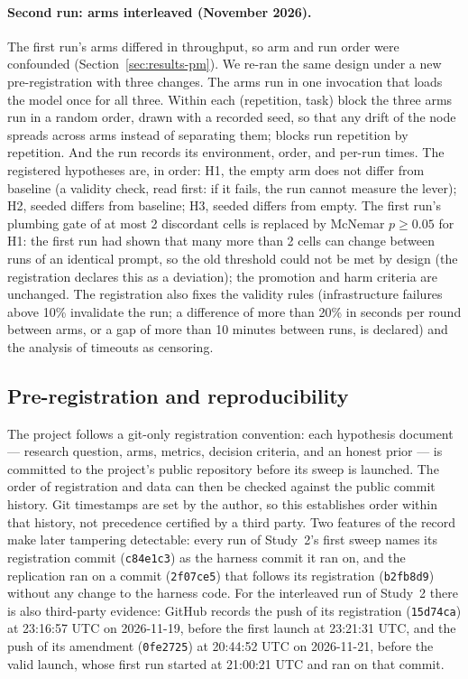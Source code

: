 \documentclass[smallcondensed,natbib]{svjour3}
\begin{document}
\paragraph{Second run: arms interleaved (November 2026).} The first
run's arms differed in throughput, so arm and run order were
confounded (Section~\ref{sec:results-pm}). We re-ran the same design
under a new pre-registration with three changes. The arms run in one
invocation that loads the model once for all three. Within each
(repetition, task) block the three arms run in a random order, drawn
with a recorded seed, so that any drift of the node spreads across
arms instead of separating them; blocks run repetition by repetition.
And the run records its environment, order, and per-run times. The
registered hypotheses are, in order: H1, the empty arm does not differ
from baseline (a validity check, read first: if it fails, the run
cannot measure the lever); H2, seeded differs from baseline; H3,
seeded differs from empty. The first run's plumbing gate of at most 2
discordant cells is replaced by McNemar $p\geq0.05$ for H1: the first
run had shown that many more than 2 cells can change between runs of
an identical prompt, so the old threshold could not be met by design
(the registration declares this as a deviation); the promotion and harm
criteria are unchanged. The registration also fixes the validity rules
(infrastructure failures above 10\% invalidate the run; a difference of
more than 20\% in seconds per round between arms, or a gap of more than
10 minutes between runs, is declared) and the analysis of timeouts as
censoring.

\subsection{Pre-registration and
reproducibility}\label{sec:method-prereg}

The project follows a git-only registration convention: each
hypothesis document --- research question, arms, metrics, decision
criteria, and an honest prior --- is committed to the project's public
repository before its sweep is launched. The order of registration
and data can then be checked against the public commit history. Git
timestamps are set by the author, so this establishes order within
that history, not precedence certified by a third party. Two features
of the record make later tampering detectable: every run of Study~2's
first sweep names its registration commit (\texttt{c84e1c3}) as the
harness commit it ran on, and the replication ran on a commit
(\texttt{2f07ce5}) that follows its registration (\texttt{b2fb8d9})
without any change to the harness code. For the interleaved run of
Study~2 there is also third-party evidence: GitHub records the push of
its registration (\texttt{15d74ca}) at 23:16:57 UTC on 2026-11-19,
before the first launch at 23:21:31 UTC, and the push of its amendment
(\texttt{0fe2725}) at 20:44:52 UTC on 2026-11-21, before the valid
launch, whose first run started at 21:00:21 UTC and ran on that commit.
\end{document}
